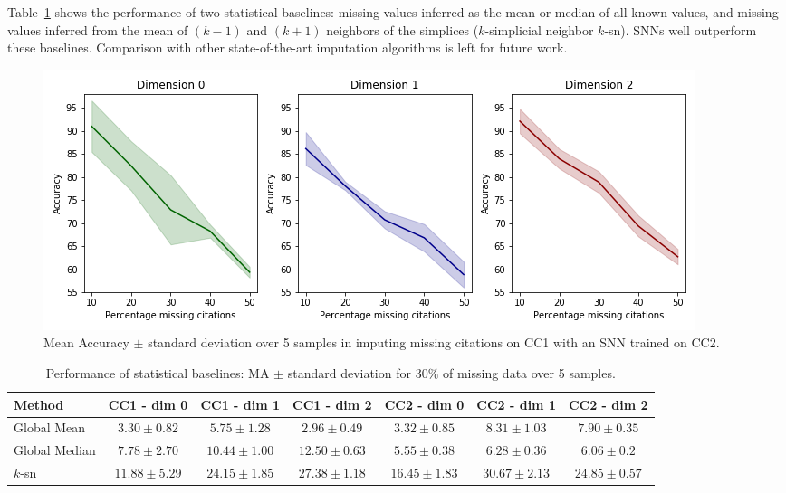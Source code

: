 Table~\ref{table:comparison-SNN} shows the performance of two statistical baselines: missing values inferred as the mean or median of all known values, and missing values inferred from the mean of $(k-1)$ and $(k+1)$ neighbors of the simplices ($k$-simplicial neighbor $k$-sn). SNNs well outperform these baselines.
Comparison with other state-of-the-art imputation algorithms is left for future work.

\begin{figure}[htbp]
  \centering
\includegraphics[scale=0.35]{./figures/accuracy_network1_pretrained.png}
  \caption{Mean Accuracy $\pm$ standard deviation over 5 samples in imputing missing citations on CC1 with an SNN trained on CC2.} \label{fig:transfer-learning}
\end{figure}



\begin{table}[htbp]
  \centering
  \scriptsize{
  \begin{tabular}{lcccccc}
    Method   & CC1 - dim 0   & CC1 - dim 1   & CC1 - dim 2   & CC2 - dim 0  & CC2 - dim 1  & CC2 - dim 2 \\
    \midrule
   Global Mean & $3.30 \pm 0.82$ & $5.75\pm 1.28$  &$ 2.96\pm 0.49$  & $3.32 \pm 0.85$ & $8.31 \pm 1.03$  & $7.90\pm 0.35$\\
    Global Median & $7.78 \pm 2.70$   & $10.44 \pm 1.00$ &$ 12.50 \pm 0.63 $ & $5.55 \pm 0.38 $&$ 6.28\pm 0.36  $&$ 6.06\pm 0.2$\\
    $k$-sn & $11.88\pm 5.29 $& $24.15 \pm 1.85$ & $27.38 \pm 1.18  $& $16.45 \pm 1.83 $&$ 30.67\pm 2.13$   &$ 24.85 \pm 0.57 $\\
  \end{tabular}}
   \vspace{2pt}
  \caption{%
      Performance of statistical baselines: MA $\pm$ standard deviation for $30\%$ of missing data over 5 samples.
  }\label{table:comparison-SNN}
\end{table}%
